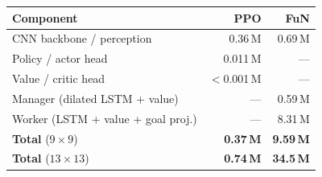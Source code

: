 \begin{table}[t]
  \centering
  \label{tab:paramcount}
  \small
  \begin{tabular}{@{}lrr@{}}
    \toprule
    Component & PPO & FuN \\
    \midrule
    CNN backbone / perception          & 0.36\,M   & 0.69\,M \\
    Policy / actor head                & 0.011\,M  & --- \\
    Value / critic head                & $<$0.001\,M & --- \\
    Manager (dilated LSTM + value)     & ---       & 0.59\,M \\
    Worker (LSTM + value + goal proj.) & ---       & 8.31\,M \\
    \midrule
    \textbf{Total} ($9{\times}9$)      & \textbf{0.37\,M} & \textbf{9.59\,M} \\
    \textbf{Total} ($13{\times}13$)    & \textbf{0.74\,M} & \textbf{34.5\,M} \\
    \bottomrule
  \end{tabular}
\end{table}
